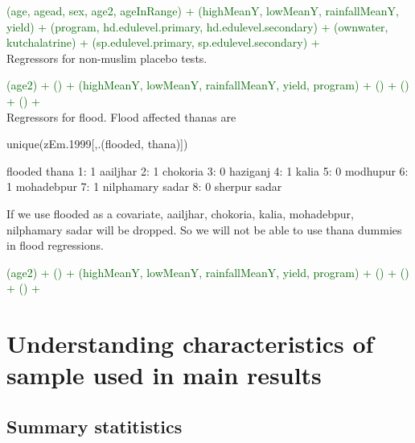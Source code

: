 \textcolor{darkgreen}{\textsf{\footnotesize (age, agead, sex, age2, ageInRange) + (highMeanY, lowMeanY, rainfallMeanY, yield) + (program, hd.edulevel.primary, hd.edulevel.secondary) + (ownwater, kutchalatrine) + (sp.edulevel.primary, sp.edulevel.secondary) +}}\\ Regressors for non-muslim placebo tests. \gobblepars

\textcolor{darkgreen}{\textsf{\footnotesize (age2) + () + (highMeanY, lowMeanY, rainfallMeanY, yield, program) + () + () + () +}}\\ Regressors for flood. Flood affected thanas are \gobblepars
\begin{Schunk}
\begin{Sinput}
unique(zEm.1999[,.(flooded, thana)])
\end{Sinput}
\begin{Soutput}
   flooded            thana
1:       1         aailjhar
2:       1         chokoria
3:       0         haziganj
4:       1            kalia
5:       0         modhupur
6:       1       mohadebpur
7:       1 nilphamary sadar
8:       0    sherpur sadar
\end{Soutput}
\end{Schunk}
If we use flooded as a covariate, aailjhar, chokoria, kalia, mohadebpur, nilphamary sadar will be dropped. So we will not be able to use thana dummies in flood regressions.\gobblepars

\textcolor{darkgreen}{\textsf{\footnotesize (age2) + () + (highMeanY, lowMeanY, rainfallMeanY, yield, program) + () + () + () +}}




\section{Understanding characteristics of sample used in main results}

\subsection{Summary statitistics}


